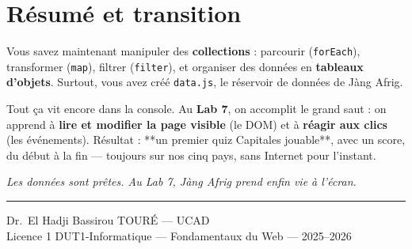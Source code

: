 \documentclass[11pt,a4paper]{article}
\newcommand{\code}[1]{\texttt{#1}}
\begin{document}
\section{Résumé et transition}

Vous savez maintenant manipuler des \textbf{collections} : parcourir (\code{forEach}), transformer (\code{map}), filtrer (\code{filter}), et organiser des données en \textbf{tableaux d'objets}. Surtout, vous avez créé \code{data.js}, le réservoir de données de Jàng Afrig.

Tout ça vit encore dans la console. Au \textbf{Lab 7}, on accomplit le grand saut : on apprend à \textbf{lire et modifier la page visible} (le DOM) et à \textbf{réagir aux clics} (les événements). Résultat : **un premier quiz Capitales jouable**, avec un score, du début à la fin --- toujours sur nos cinq pays, sans Internet pour l'instant.

\begin{center}
\textit{Les données sont prêtes. Au Lab 7, Jàng Afrig prend enfin vie à l'écran.}
\end{center}

\bigskip
\noindent\rule{\textwidth}{0.4pt}
\begin{center}
\small Dr.~El Hadji Bassirou TOURÉ --- UCAD\\
\small Licence 1 DUT1-Informatique --- Fondamentaux du Web --- 2025--2026
\end{center}
\end{document}
